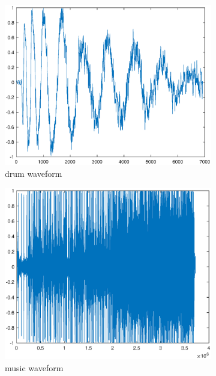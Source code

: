 \begin{figure}[h!]
	\centering
	\begin{subfigure}[t]{0.32\linewidth}
		\includegraphics[width=1\linewidth]{figures/part1/drum.eps}
		\caption{drum waveform}
		\label{fig:drum}
	\end{subfigure}
	\begin{subfigure}[t]{0.32\linewidth}
		\centering
		\includegraphics[width=1\linewidth]{figures/part1/piece_of_music.eps}
		\caption{music waveform}
		\label{fig:music}
	\end{subfigure}
	\begin{subfigure}[t]{0.32\linewidth}

\end{subfigure}
\end{figure}
